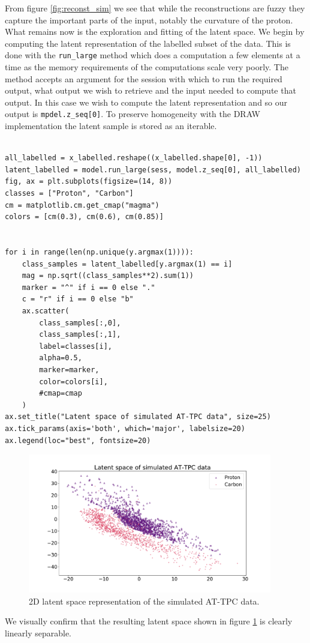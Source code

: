From figure \ref{fig:reconst_sim} we see that while the reconstructions are fuzzy they capture the important parts of the input, notably  the curvature of the proton. What remains now is the exploration and fitting of the latent space. We begin by computing the latent representation of the labelled subset of the data. This is done with the \lstinline{run_large} method which does a computation a few elements at a time as the memory requirements of the computations scale very poorly. The method accepts an argument for the session with which to run the required output, what output we wish to retrieve and the input needed to compute that output. In this case we wish to compute the latent representation and so our output is \lstinline{mpdel.z_seq[0]}. To preserve homogeneity with the DRAW implementation the latent sample is stored as an iterable. 

\begin{minipage}{\linewidth}
\begin{lstlisting}[language=iPython]

all_labelled = x_labelled.reshape((x_labelled.shape[0], -1))
latent_labelled = model.run_large(sess, model.z_seq[0], all_labelled)
fig, ax = plt.subplots(figsize=(14, 8))
classes = ["Proton", "Carbon"]
cm = matplotlib.cm.get_cmap("magma")
colors = [cm(0.3), cm(0.6), cm(0.85)]


for i in range(len(np.unique(y.argmax(1)))):
    class_samples = latent_labelled[y.argmax(1) == i]
    mag = np.sqrt((class_samples**2).sum(1))
    marker = "^" if i == 0 else "."
    c = "r" if i == 0 else "b"
    ax.scatter(
        class_samples[:,0],
        class_samples[:,1],
        label=classes[i],
        alpha=0.5,
        marker=marker,
        color=colors[i],
        #cmap=cmap
    )
ax.set_title("Latent space of simulated AT-TPC data", size=25)
ax.tick_params(axis='both', which='major', labelsize=20)
ax.legend(loc="best", fontsize=20) 
\end{lstlisting}
\end{minipage}

\begin{figure}[ht]
\centering
\includegraphics[width=0.95\textwidth, ]{latent_sim.pdf}
\caption[2D latent space for simulated data]{2D latent space representation of the simulated AT-TPC data.}\label{fig:latent_sim}
\end{figure}

\noindent We visually confirm that the resulting latent space shown in figure \ref{fig:latent_sim} is clearly linearly separable.

